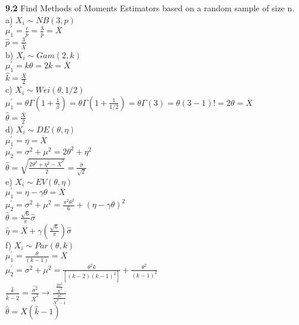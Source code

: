
{\bf 9.2} Find Methods of Moments Estimators based on a random sample of size n. \\

a) ${ X }_{ i }\sim NB(3,p)$\\
${ \mu  }_{ 1 }^{ ' }= \frac{r}{p} = \frac{3}{p} = \overline { X } $\\
$\hat { p } = \frac{3}{\overline { X }}$\\


b) ${ X }_{ i }\sim Gam(2,k)$\\
${ \mu  }_{ 1 }^{ ' }= k\theta = 2k = \overline { X } $\\
$\hat { k } = \frac{\overline { X }}{2}$\\


c) ${ X }_{ i }\sim Wei(\theta,1/2)$\\
${ \mu  }_{ 1 }^{ ' }= \theta \Gamma (1+\frac { 1 }{ \beta  } ) = \theta \Gamma (1+\frac { 1 }{ 1/2  } ) = \theta \Gamma (3) = \theta(3-1)! = 2\theta = \overline{X}  $\\
$\hat { \theta } = \frac{\overline { X }}{2}$\\


d) ${ X }_{ i }\sim DE(\theta,\eta)$\\
${ \mu  }_{ 1 }^{ ' }= \eta = \overline{X}  $\\
${ \mu  }_{ 2 }^{ ' }= \sigma^{2}+\mu^{2} = 2\theta^{2}+\eta^{2}$\\
$ \hat{\theta}= \sqrt{\frac{2\theta^{2}+\eta^{2}-\overline{X}^{2}}{2}}=\frac{\hat{\sigma}}{\sqrt{2}}$\\


e) ${ X }_{ i }\sim EV(\theta,\eta)$\\
${ \mu  }_{ 1 }^{ ' }= \eta - \gamma \theta = \overline{X}  $\\
${ \mu  }_{ 2 }^{ ' }= \sigma^{2}+\mu^{2} = \frac{\pi^{2}\theta^{2}}{6} + (\eta - \gamma \theta)^{2}$\\
$ \hat{\theta}= \frac{\sqrt{6}}{\pi}\hat{\sigma}$\\
$ \hat{\eta}= \overline{X}+\gamma(\frac{\sqrt{6}}{\pi})\hat{\sigma}$\\


f) ${ X }_{ i }\sim Par(\theta,k)$\\
${ \mu  }_{ 1 }^{ ' }= \frac{\theta}{(k-1)} = \overline{X}$\\
${ \mu  }_{ 2 }^{ ' }= \sigma^{2}+\mu^{2} = \frac{\theta^{2}k}{[(k-2)(k-1)^{2}]}+\frac{\theta^{2}}{(k-1)^{2}}$\\
$ \frac{\hat{k}}{\hat{k}-2}=\frac{\hat{\sigma^{2}}}{\overline{X}^{2}} \rightarrow \frac{\frac{2\sigma^{2}}{\overline{X}^{2}}}{\frac{\sigma^{2}}{\overline{X}^{2}-1}}$\\
$ \hat{\theta}=\overline{X}(\hat{k}-1)$\\
